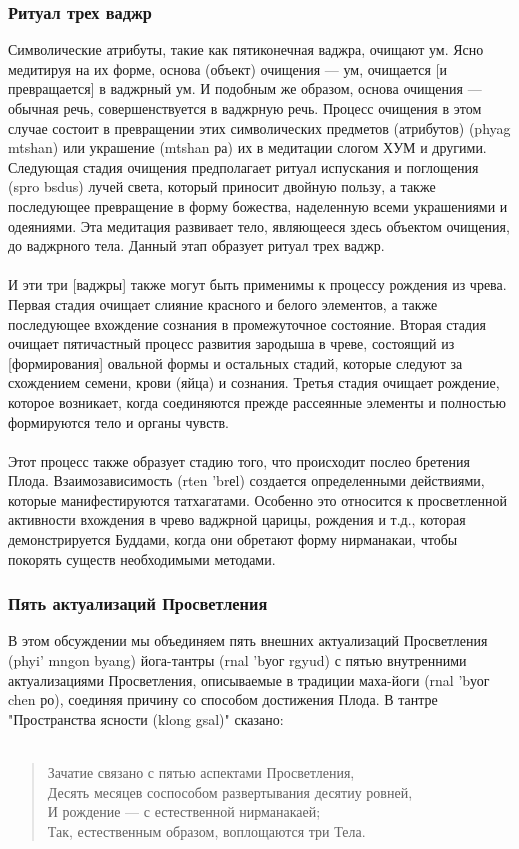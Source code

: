 \subsubsection{Ритуал трех ваджр}

Символические атрибуты, такие как пятиконечная ваджра, очищают ум. Ясно медитируя
на их форме, основа (объект) очищения — ум, очищается [и превращается] в ваджрный ум.
И подобным же образом, основа очищения — обычная речь, совершенствуется в ваджрную речь.
Процесс очищения в этом случае состоит в превращении этих символических предметов
(атрибутов) (phyag mtshan) или украшение (mtshan ра) их в медитации слогом ХУМ и
другими. Следующая стадия очищения предполагает ритуал испускания и поглощения (spro
bsdus) лучей света, который приносит двойную пользу, а также последующее превращение в
форму божества, наделенную всеми украшениями и одеяниями. Эта медитация развивает
тело, являющееся здесь объектом очищения, до ваджрного тела. Данный этап образует
ритуал трех ваджр.\\
\\
И эти три [ваджры] также могут быть применимы к процессу рождения из чрева. Первая
стадия очищает слияние красного и белого элементов, а также последующее вхождение
сознания в промежуточное состояние. Вторая стадия очищает пятичастный процесс развития
зародыша в чреве, состоящий из [формирования] овальной формы и остальных стадий,
которые следуют за схождением семени, крови (яйца) и сознания. Третья стадия очищает
рождение, которое возникает, когда соединяются прежде рассеянные элементы и полностью
формируются тело и органы чувств.\\
\\
Этот процесс также образует стадию того, что происходит послео бретения Плода.
Взаимозависимость (rten 'brеl) создается определенными действиями, которые
манифестируются татхагатами. Особенно это относится к просветленной активности
вхождения в чрево ваджрной царицы, рождения и т.д., которая демонстрируется Буддами,
когда они обретают форму нирманакаи, чтобы покорять существ необходимыми методами.

\subsubsection{Пять актуализаций Просветления}

В этом обсуждении мы объединяем пять внешних актуализаций Просветления (phyi' mngon byang)
йога-тантры (rnal 'bуог rgyud) с пятью внутренними актуализациями
Просветления, описываемые в традиции маха-йоги (rnal 'bуог chen ро), соединяя причину со
способом достижения Плода. В тантре "Пространства ясности (klong gsal)" сказано:\\
\\
\begin{verse}
Зачатие связано с пятью аспектами Просветления,\\
Десять месяцев соспособом развертывания десятиу ровней,\\
И рождение — с естественной нирманакаей;\\
Так, естественным образом, воплощаются три Тела.
\end{verse}

